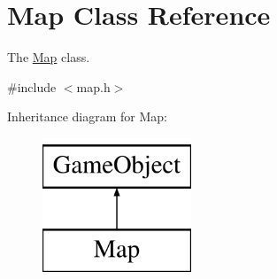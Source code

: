 \hypertarget{class_map}{\section{\-Map \-Class \-Reference}
\label{class_map}
}


\-The \hyperlink{class_map}{\-Map} class.  




{\ttfamily \#include $<$map.\-h$>$}

\-Inheritance diagram for \-Map\-:\begin{figure}[H]
\begin{center}
\leavevmode
\includegraphics[height=4.000000cm]{class_map}
\end{center}
\end{figure}
